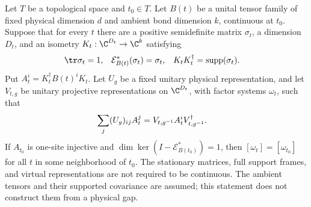 \begin{lemma}
    \label{thm:spc_aux_topological_stationary_support_class}
    \leanok
    Let $T$ be a topological space and $t_0\in T$. Let $B(t)$ be a unital
    tensor family of fixed physical dimension $d$ and ambient bond
    dimension $k$, continuous at $t_0$. Suppose that for every $t$ there
    are a positive semidefinite matrix $\sigma_t$, a dimension $D_t$,
    and an isometry $K_t:\C^{D_t}\to\C^k$ satisfying
    \begin{align}
        \tr\sigma_t                   & =1,                                   &
        \mathcal E_{B(t)}^*(\sigma_t) & =\sigma_t,                            &
        K_tK_t^\dagger                & =\operatorname{supp}(\sigma_t).\notag
    \end{align}
    Put $A_t^i=K_t^\dagger B(t)^iK_t$. Let $U_g$ be a fixed unitary
    physical representation, and let $V_{t,g}$ be unitary projective
    representations on $\C^{D_t}$, with factor systems $\omega_t$, such that
    \begin{align}
        \sum_j(U_g)_{ij}A_t^j
         & =V_{t,g^{-1}}A_t^iV_{t,g^{-1}}^\dagger.\notag
    \end{align}
    If $A_{t_0}$ is one-site injective and
    $\dim\ker(I-\mathcal E_{B(t_0)}^*)=1$, then
    $[\omega_t]=[\omega_{t_0}]$ for all $t$ in some neighborhood of $t_0$.
    The stationary matrices, full support frames, and virtual
    representations are not required to be continuous. The ambient
    tensors and their supported covariance are assumed;
    this statement does not construct them from a physical gap.
\end{lemma}

